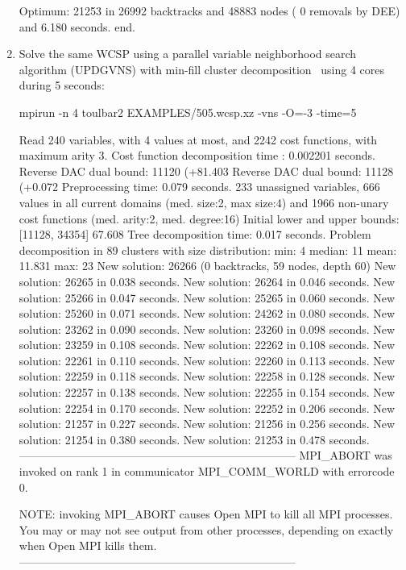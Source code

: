 \begin{enumerate}
{\begin{DoxyCode}
Optimum: 21253 in 26992 backtracks and 48883 nodes ( 0 removals by DEE) and 6.180 seconds.
end.
\end{DoxyCode}}
\item Solve the same WCSP using a parallel variable neighborhood search algorithm (UPDGVNS) with min-fill cluster decomposition~\cite{Ouali17} using 4 cores during 5 seconds:
\begin{DoxyCode}
	mpirun -n 4 toulbar2 EXAMPLES/505.wcsp.xz -vns -O=-3 -time=5
\end{DoxyCode}
{\scriptsize
\begin{DoxyCode}
Read 240 variables, with 4 values at most, and 2242 cost functions, with maximum arity 3.
Cost function decomposition time : 0.002201 seconds.
Reverse DAC dual bound: 11120 (+81.403%
Reverse DAC dual bound: 11128 (+0.072%
Preprocessing time: 0.079 seconds.
233 unassigned variables, 666 values in all current domains (med. size:2, max size:4) and 1966 non-unary cost functions (med. arity:2, med. degree:16)
Initial lower and upper bounds: [11128, 34354] 67.608%
Tree decomposition time: 0.017 seconds.
Problem decomposition in 89 clusters with size distribution: min: 4 median: 11 mean: 11.831 max: 23
New solution: 26266 (0 backtracks, 59 nodes, depth 60)
New solution: 26265 in 0.038 seconds.
New solution: 26264 in 0.046 seconds.
New solution: 25266 in 0.047 seconds.
New solution: 25265 in 0.060 seconds.
New solution: 25260 in 0.071 seconds.
New solution: 24262 in 0.080 seconds.
New solution: 23262 in 0.090 seconds.
New solution: 23260 in 0.098 seconds.
New solution: 23259 in 0.108 seconds.
New solution: 22262 in 0.108 seconds.
New solution: 22261 in 0.110 seconds.
New solution: 22260 in 0.113 seconds.
New solution: 22259 in 0.118 seconds.
New solution: 22258 in 0.128 seconds.
New solution: 22257 in 0.138 seconds.
New solution: 22255 in 0.154 seconds.
New solution: 22254 in 0.170 seconds.
New solution: 22252 in 0.206 seconds.
New solution: 21257 in 0.227 seconds.
New solution: 21256 in 0.256 seconds.
New solution: 21254 in 0.380 seconds.
New solution: 21253 in 0.478 seconds.
--------------------------------------------------------------------------
MPI_ABORT was invoked on rank 1 in communicator MPI_COMM_WORLD 
with errorcode 0.

NOTE: invoking MPI_ABORT causes Open MPI to kill all MPI processes.
You may or may not see output from other processes, depending on
exactly when Open MPI kills them.
--------------------------------------------------------------------------


\end{DoxyCode}}
\end{enumerate}

